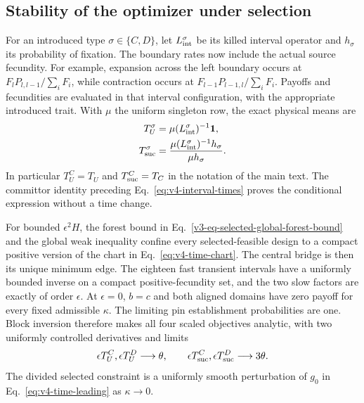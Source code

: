 \documentclass[aps,pre,reprint,amsmath,amssymb,longbibliography]{revtex4-2}
\begin{document}
\subsection{Stability of the optimizer under selection}
\label{app:v7-selected-time}
For an introduced type $\sigma\in\{C,D\}$, let
$L_{\rm int}^{\sigma}$ be its killed interval operator and
$h_{\sigma}$ its probability of fixation. The boundary rates now
include the actual source fecundity. For example, expansion across
the left boundary occurs at
$F_lP_{l,l-1}/\sum_iF_i$, while contraction occurs at
$F_{l-1}P_{l-1,l}/\sum_iF_i$. Payoffs and fecundities are evaluated
in that interval configuration, with the appropriate introduced
trait. With $\mu$ the uniform singleton row, the exact physical
means are
\begin{equation}
 \begin{aligned}
 T_U^{\sigma}&=\mu(L_{\rm int}^{\sigma})^{-1}\mathbf1,\\
 T_{\rm suc}^{\sigma}
 &=\frac{\mu(L_{\rm int}^{\sigma})^{-1}h_{\sigma}}
          {\mu h_{\sigma}}.
 \end{aligned}
 \label{eq:v7-selected-interval-times}
\end{equation}
In particular $T_U^C=T_U$ and $T_{\rm suc}^C=T_C$ in the notation
of the main text. The committor identity preceding
Eq.~\eqref{eq:v4-interval-times} proves the conditional expression
without a time change.

For bounded $\epsilon^2H$, the forest bound in
Eq.~\eqref{v3-eq-selected-global-forest-bound} and the global weak
inequality confine every selected-feasible design to a compact
positive version of the chart in Eq.~\eqref{eq:v4-time-chart}.
The central bridge is then its unique minimum edge. The eighteen
fast transient intervals have a uniformly bounded inverse on a
compact positive-fecundity set, and the two slow factors are exactly
of order $\epsilon$. At $\epsilon=0$, $b=c$ and both aligned
domains have zero payoff for every fixed admissible $\kappa$.
The limiting pin establishment probabilities are one. Block
inversion therefore makes all four scaled objectives analytic,
with two uniformly controlled derivatives and limits
\begin{equation}
 \epsilon T_U^C,\epsilon T_U^D\longrightarrow\theta,
 \qquad
 \epsilon T_{\rm suc}^C,\epsilon T_{\rm suc}^D
 \longrightarrow3\theta.
 \label{eq:v7-selected-time-limits}
\end{equation}
The divided selected constraint is a uniformly smooth perturbation
of $g_0$ in Eq.~\eqref{eq:v4-time-leading} as $\kappa\to0$.
\end{document}
